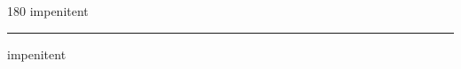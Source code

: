 
\begin{frame}
\begin{center}
\begin{turn}{180}
{\fontsize{2.5cm}{1em}\selectfont impenitent}
\end{turn}
\vspace{1em}\par  
\hrule
\vspace{1em}\par  
{\fontsize{2.5cm}{1em}\selectfont impenitent}
\end{center}
\end{frame}
